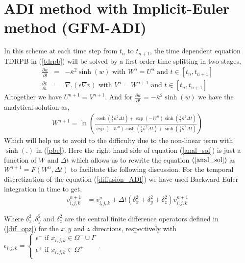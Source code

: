 
\section{ADI method with Implicit-Euler method (GFM-ADI)}
\label{sec:GFM-ADI}

In this scheme at each time step from $t_n$ to $t_{n+1}$, the time dependent equation TDRPB in  (\ref{tdrpb}) will be solved by a first order time splitting in two stages, 
\begin{eqnarray}
  \frac{\partial w}{\partial t}&=& -\bar\kappa^2 \sinh(w) \text{ with } W^n=U^n\text{ and } t \in \left[t_n,t_{n+1}\right]\label{non_linear_ADI}\\
 \frac{\partial v}{\partial t}&=&  \nabla . (\epsilon\nabla v) \text{ with } V^n=W^{n+1}\text{ and } t \in \left[t_n,t_{n+1}\right]	 \label{diffusion_ADI}
\end{eqnarray}  
Altogether we have $U^{n+1}=V^{n+1}$. And for $ \frac{\partial w}{\partial t}= -\bar\kappa^2 \sinh(w)$ we have the analytical solution as, 	
	\begin{eqnarray}	
W^{n+1}= \ln \left( \frac{\cosh(\frac{1}{2}\bar\kappa^2\Delta t)+\exp(-W^n)\sinh(\frac{1}{2}\bar\kappa^2\Delta t)}{\exp(-W^n)\cosh(\frac{1}{2}\bar\kappa^2\Delta t)+\sinh(\frac{1}{2}\bar\kappa^2\Delta t)}\right)\label{anal_sol}
\end{eqnarray}
Which will help us to avoid to the difficulty due to the non-linear term with $\sinh(.)$ in (\ref{pbe}). Here the right hand side of equation (\ref{anal_sol}) is just a function of $W$ and $\Delta t$ which allows us to rewrite the equation $(\ref{anal_sol})$ as $W^{n+1}=F(W^n,\Delta t)$ to facilitate the following discussion. 
For the temporal discretization of the equation (\ref{diffusion_ADI}) we have used Backward-Euler integration in time to get, 
\begin{eqnarray}
	v_{i,j,k}^{n+1} &=v_{i,j,k}^{n}+\Delta t \left(\delta_x^2+\delta_y^2+\delta_z^2\right)v_{i,j,k}^{n+1} \label{imp-eu}
\end{eqnarray}	

 Where $\delta_x^2,\delta_y^2$ and $\delta_z^2$ are the central finite difference operators defined in (\ref{dif_opz}) for the $x,y$ and $z$ directions, respectively with $\epsilon_{i,j,k}= \displaystyle\begin{cases}
	\epsilon^- \text{ if } x_{i,j,k}\in\Omega^- \cup \Gamma \\
	\epsilon^+ \text{ if } x_{i,j,k}\in\Omega^+\\
	\end{cases}$.

